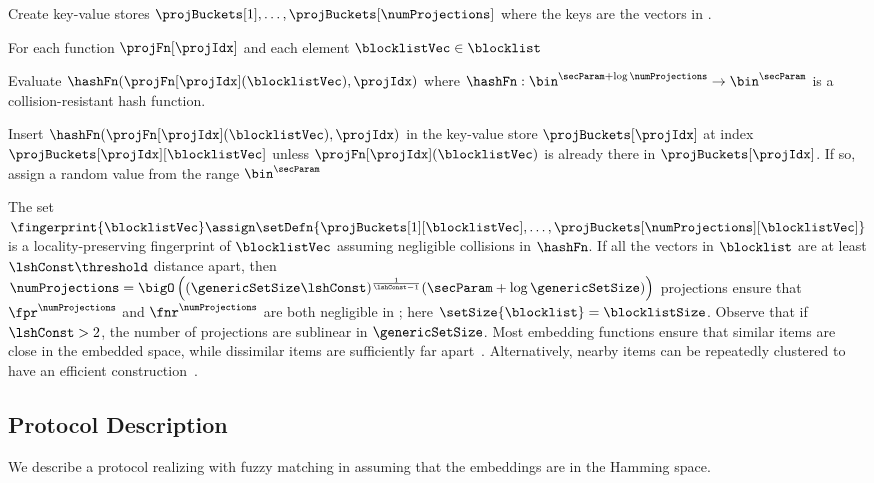 \enumListStart
\item Create \numProjections key-value stores $\projBuckets[1], \dots, \projBuckets[\numProjections]$ where the keys are the vectors in \blocklist.
\item For each function $\projFn[\projIdx]$ and each element $\blocklistVec \in \blocklist$
\enumListStart
\item Evaluate  $\hashFn(\projFn[\projIdx](\blocklistVec), \projIdx)$ where $\hashFn: \bin^{\secParam + \log \numProjections} \rightarrow \bin^{\secParam}$ is a collision-resistant hash function. 
\item Insert $\hashFn(\projFn[\projIdx](\blocklistVec), \projIdx)$  in the key-value store $\projBuckets[\projIdx]$ at index $\projBuckets[\projIdx][\blocklistVec]$ unless $\projFn[\projIdx](\blocklistVec)$ is already there in $\projBuckets[\projIdx]$. If so, assign a random value from the range $\bin^{\secParam}$
\enumListEnd
\enumListEnd

The set $\fingerprint{\blocklistVec} \assign \setDefn{\projBuckets[1][\blocklistVec], \dots, \projBuckets[\numProjections][\blocklistVec]}$ is a locality-preserving 
fingerprint of $\blocklistVec$ assuming negligible collisions in $\hashFn$. If all the vectors in $\blocklist$ are at least $\lshConst 
\threshold$ distance apart, then $\numProjections = \bigO\left((\genericSetSize 
\lshConst)^{\frac{1}{\lshConst - 1}} (\secParam + \log \genericSetSize)\right)$ projections ensure that 
$\fpr^\numProjections$ and $\fnr^\numProjections$ are both negligible in \secParam; here $\setSize{\blocklist} = \blocklistSize$. Observe that if $\lshConst > 2$, the number of projections are sublinear in 
$\genericSetSize$. Most embedding functions ensure that similar 
items are close in the embedded space, while dissimilar items are sufficiently far apart~\cite{kulshrestha2021identifying, mckeown2023hamming}. Alternatively, nearby items can be repeatedly 
clustered to have an efficient construction~\cite{chongchitmate2024approximate}.


\subsection{Protocol Description}
%
We describe a protocol realizing \contentModFunc with fuzzy matching in  assuming that the embeddings are in the Hamming space. 


